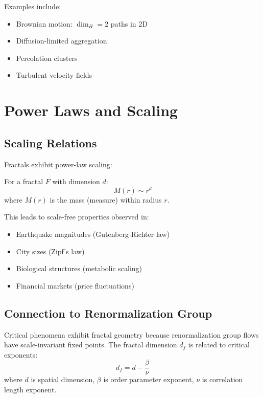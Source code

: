 Examples include:
\begin{itemize}
    \item Brownian motion: $\dim_H = 2$ paths in 2D
    \item Diffusion-limited aggregation
    \item Percolation clusters
    \item Turbulent velocity fields
\end{itemize}

\section{Power Laws and Scaling}

\subsection{Scaling Relations}

Fractals exhibit power-law scaling:

\begin{theorem}
For a fractal $F$ with dimension $d$:
\begin{equation}
    M(r) \sim r^d
\end{equation}
where $M(r)$ is the mass (measure) within radius $r$.
\end{theorem}

This leads to scale-free properties observed in:
\begin{itemize}
    \item Earthquake magnitudes (Gutenberg-Richter law)
    \item City sizes (Zipf's law)
    \item Biological structures (metabolic scaling)
    \item Financial markets (price fluctuations)
\end{itemize}

\subsection{Connection to Renormalization Group}

\begin{theorem}
Critical phenomena exhibit fractal geometry because renormalization group flows have scale-invariant fixed points. The fractal dimension $d_f$ is related to critical exponents:
\begin{equation}
    d_f = d - \frac{\beta}{\nu}
\end{equation}
where $d$ is spatial dimension, $\beta$ is order parameter exponent, $\nu$ is correlation length exponent.
\end{theorem}

